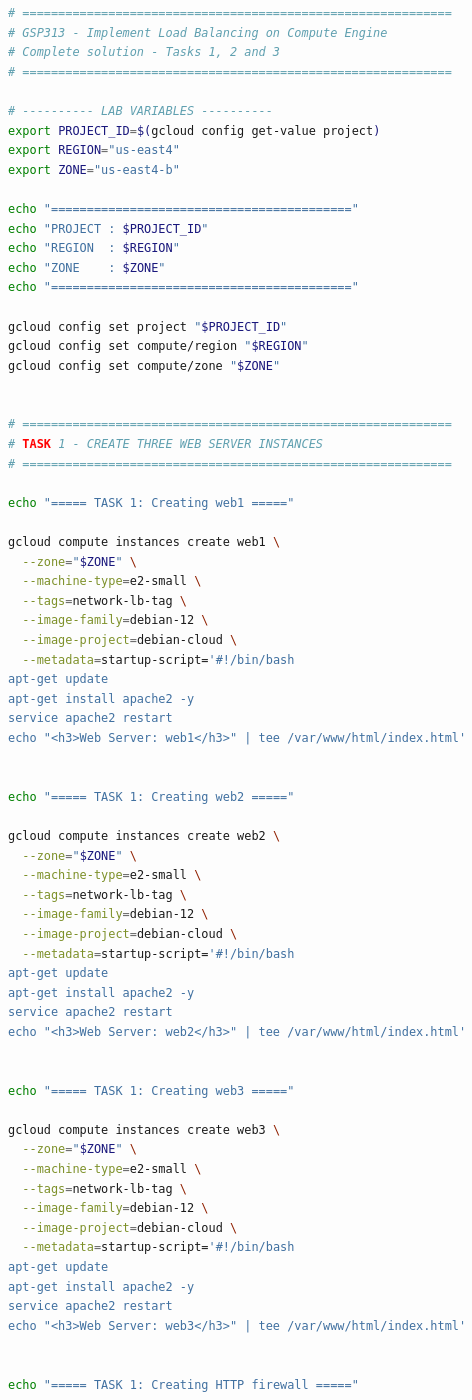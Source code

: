 \documentclass{article}
\begin{document}
\begin{lstlisting}[language=bash]
# ============================================================
# GSP313 - Implement Load Balancing on Compute Engine
# Complete solution - Tasks 1, 2 and 3
# ============================================================

# ---------- LAB VARIABLES ----------
export PROJECT_ID=$(gcloud config get-value project)
export REGION="us-east4"
export ZONE="us-east4-b"

echo "=========================================="
echo "PROJECT : $PROJECT_ID"
echo "REGION  : $REGION"
echo "ZONE    : $ZONE"
echo "=========================================="

gcloud config set project "$PROJECT_ID"
gcloud config set compute/region "$REGION"
gcloud config set compute/zone "$ZONE"


# ============================================================
# TASK 1 - CREATE THREE WEB SERVER INSTANCES
# ============================================================

echo "===== TASK 1: Creating web1 ====="

gcloud compute instances create web1 \
  --zone="$ZONE" \
  --machine-type=e2-small \
  --tags=network-lb-tag \
  --image-family=debian-12 \
  --image-project=debian-cloud \
  --metadata=startup-script='#!/bin/bash
apt-get update
apt-get install apache2 -y
service apache2 restart
echo "<h3>Web Server: web1</h3>" | tee /var/www/html/index.html'


echo "===== TASK 1: Creating web2 ====="

gcloud compute instances create web2 \
  --zone="$ZONE" \
  --machine-type=e2-small \
  --tags=network-lb-tag \
  --image-family=debian-12 \
  --image-project=debian-cloud \
  --metadata=startup-script='#!/bin/bash
apt-get update
apt-get install apache2 -y
service apache2 restart
echo "<h3>Web Server: web2</h3>" | tee /var/www/html/index.html'


echo "===== TASK 1: Creating web3 ====="

gcloud compute instances create web3 \
  --zone="$ZONE" \
  --machine-type=e2-small \
  --tags=network-lb-tag \
  --image-family=debian-12 \
  --image-project=debian-cloud \
  --metadata=startup-script='#!/bin/bash
apt-get update
apt-get install apache2 -y
service apache2 restart
echo "<h3>Web Server: web3</h3>" | tee /var/www/html/index.html'


echo "===== TASK 1: Creating HTTP firewall ====="


\end{lstlisting}
\end{document}
